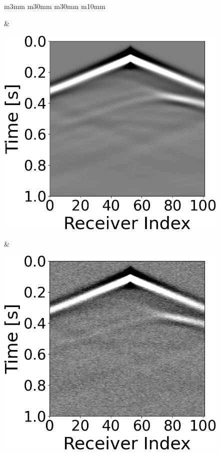 \begin{figure}[t]
    \centering
    \begin{tabular}{m{3mm} m{30mm} m{30mm} m{10mm}}
        \begin{minipage}[b]{\linewidth}\end{minipage} &

        \begin{minipage}[b]{\linewidth}
            \centering
            \includegraphics[width=\linewidth]{public/seismic_data}
            \vspace{-7mm}
            \caption*{}
            \vspace{1mm}
        \end{minipage} &
        \begin{minipage}[b]{\linewidth}
            \centering
            \vspace{1mm}
            \includegraphics[width=\linewidth]{public/seismic_data_noisy}

\end{minipage}
\end{tabular}
\end{figure}
